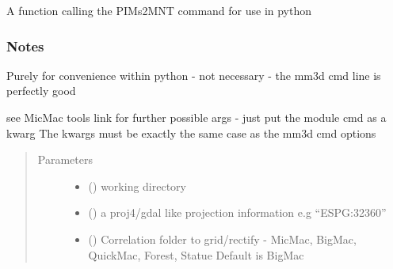 \documentclass[letterpaper,10pt,english]{sphinxmanual}
\begin{document}

\begin{fulllineitems}
\label{\detokenize{pycmac:dense_match.PIMs2MNT}}
A function calling the PIMs2MNT command for use in python
\subsubsection*{Notes}

Purely for convenience within python - not  necessary - the mm3d cmd line
is perfectly good

see MicMac tools link for further possible args - just put the module cmd as a kwarg
The kwargs must be exactly the same case as the mm3d cmd options
\begin{quote}\begin{description}
\item[{Parameters}] \leavevmode\begin{itemize}
\item {} 
 () \textendash{} working directory

\item {} 
 () \textendash{} a proj4/gdal like projection information e.g “ESPG:32360”

\item {} 
 () \textendash{} Correlation folder to grid/rectify - MicMac, BigMac, QuickMac, Forest, Statue
Default is BigMac

\end{itemize}

\end{description}\end{quote}

\end{fulllineitems}

\end{document}

